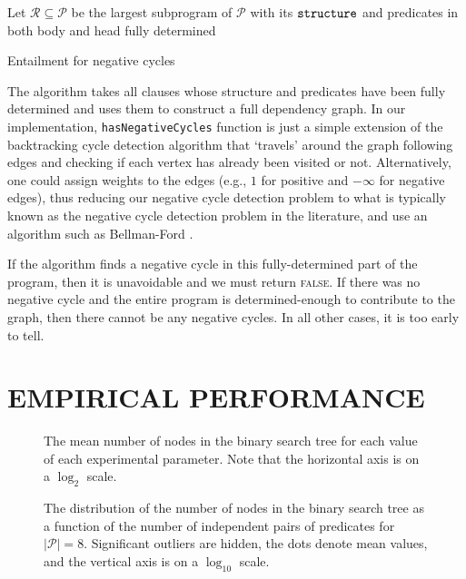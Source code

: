 \documentclass[letterpaper]{article}
\theoremstyle{definition}
\newcommand{\variable}[1]{\texttt{\textup{#1}}}
\newcommand{\predicates}{\mathcal{P}}
\begin{document}
\begin{algorithm}
  Let $\mathscr{R} \subseteq \mathscr{P}$ be the largest subprogram of
  $\mathscr{P}$ with its $\variable{structure}$ and predicates in both body
  and head fully determined\footnotemark\;
  \;
  \caption{Entailment for negative cycles}
  \label{alg:negative_cycles}
\end{algorithm}

The algorithm takes all clauses whose structure and predicates have been fully
determined and uses them to construct a full dependency graph. In our
implementation, \texttt{hasNegativeCycles} function is just a simple extension
of the backtracking cycle detection algorithm that `travels' around the graph
following edges and checking if each vertex has already been visited or not.
Alternatively, one could assign weights to the edges (e.g., $1$ for positive
and $-\infty$ for negative edges), thus reducing our negative cycle detection
problem to what is typically known as the negative cycle detection problem in
the literature, and use an algorithm such as Bellman-Ford
\citep{shimbel1954structure}.

If the algorithm finds a negative cycle in this fully-determined part of the
program, then it is unavoidable and we must return \textsc{false}. If there was
no negative cycle and the entire program is determined-enough to contribute to
the graph, then there cannot be any negative cycles. In all other cases, it
is too early to tell.

\section{EMPIRICAL PERFORMANCE} \label{sec:experiments}

\begin{figure}
  \centering
  
  \caption{The mean number of nodes in the binary search tree for each value of
    each experimental parameter. Note that the horizontal axis is on a $\log_2$
    scale.}
  \label{fig:impact}
\end{figure}

\begin{figure*}
  \centering
  
  \caption{The distribution of the number of nodes in the binary search tree as
    a function of the number of independent pairs of predicates for
    $|\predicates| = 8$. Significant outliers are hidden, the dots denote mean
    values, and the vertical axis is on a $\log_{10}$ scale.}
  \label{fig:phase_transition}
\end{figure*}
\end{document}
